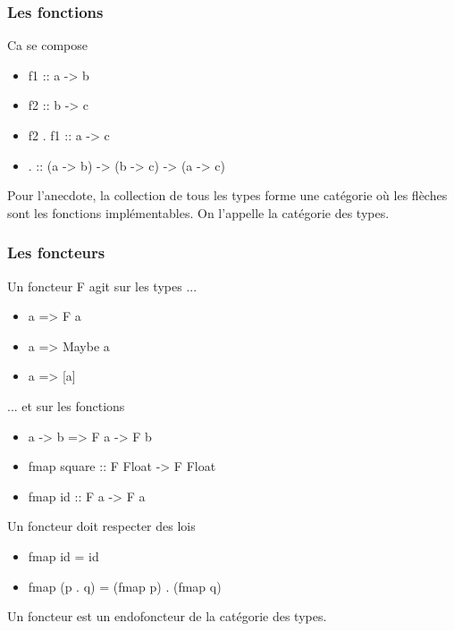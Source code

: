 \documentclass{beamer}
\begin{document}
\begin{frame}
\frametitle{Les fonctions}
\begin{block}{Ca se compose}
\begin{itemize}
\item f1 :: a -> b
\item f2 :: b -> c
\item f2 . f1 :: a -> c
\pause
\item . :: (a -> b) -> (b -> c) -> (a -> c)
\end{itemize}
\end{block}
\pause

Pour l’anecdote, la collection de tous les types forme une catégorie où les flèches sont les fonctions implémentables. On l’appelle la catégorie des types.

\end{frame}


\begin{frame}
\frametitle{Les foncteurs}
\begin{block}{Un foncteur F agit sur les types ...}
\begin{itemize}
\item a => F a
\end{itemize}
\end{block}
\begin{exampleblock}{}
\begin{itemize}
\item a => Maybe a
\item a => [a]
\end{itemize}
\end{exampleblock}

\pause

\begin{block}{... et sur les fonctions}
\begin{itemize}
\item a -> b => F a -> F b
\end{itemize}
\end{block}

\begin{exampleblock}{}
\begin{itemize}
\item fmap square :: F Float -> F Float
\item fmap id :: F a -> F a
\end{itemize}
\end{exampleblock}
\end{frame}

\begin{frame}
\begin{alertblock}{Un foncteur doit respecter des lois}
\begin{itemize}
\item fmap id = id
\item fmap (p . q) = (fmap p) . (fmap q)

\end{itemize}
\end{alertblock}

\pause
Un foncteur est un endofoncteur de la catégorie des types.
\end{frame}
\end{document}
